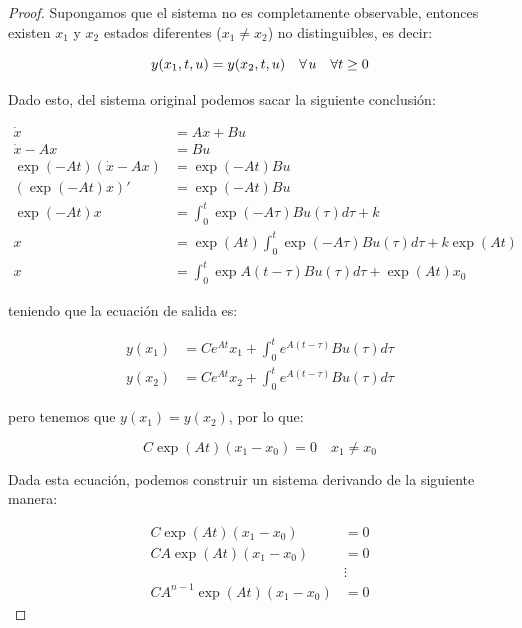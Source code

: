 		\begin{proof}
			Supongamos que el sistema no es completamente observable, entonces existen $x_1$ y $x_2$ estados diferentes ($x_1 \ne x_2$) no distinguibles, es decir:

			\begin{equation*}
				y(x_1, t, u) = y(x_2, t, u) \quad \forall \mkern2mu u \quad \forall t \geq 0
			\end{equation*}

			Dado esto, del sistema original podemos sacar la siguiente conclusión:

			\begin{align*}
				\dot{x} &= A x + B u \\
				\dot{x} - A x &= B u \\
				\exp{(-A t)} (\dot{x} - A x) &= \exp{(-A t)} B u \\
				(\exp{(-A t)} x)' &= \exp{(-A t)} B u \\
				\exp{(-A t)} x &= \int_0^t \exp{(-A \tau)} B u(\tau) d\tau + k \\
				x &= \exp{(A t)} \int_0^t \exp{(-A \tau)} B u(\tau) d\tau + k \exp{(A t)}\\
				x &= \int_0^t \exp{A(t - \tau)} B u(\tau) d\tau + \exp{(At)}x_0
			\end{align*}

			teniendo que la ecuación de salida es:

			\begin{align*}
				y(x_1) &= C e^{A t} x_1 + \int_0^t e^{A(t - \tau)} B u(\tau) d\tau \\
				y(x_2) &= C e^{A t} x_2 + \int_0^t e^{A(t - \tau)} B u(\tau) d\tau
			\end{align*}

			pero tenemos que $y(x_1) = y(x_2)$, por lo que:

			\begin{equation*}
				C \exp{(A t)} (x_1 - x_0) = 0 \quad x_1 \ne x_0
			\end{equation*}

			Dada esta ecuación, podemos construir un sistema derivando de la siguiente manera:

			\begin{align*}
				C \exp{(A t)} (x_1 - x_0) &= 0 \\
				C A \exp{(A t)} (x_1 - x_0) &= 0 \\
				&\vdots \\
				C A^{n-1} \exp{(A t)} (x_1 - x_0) &= 0
			\end{align*}


\end{proof}

